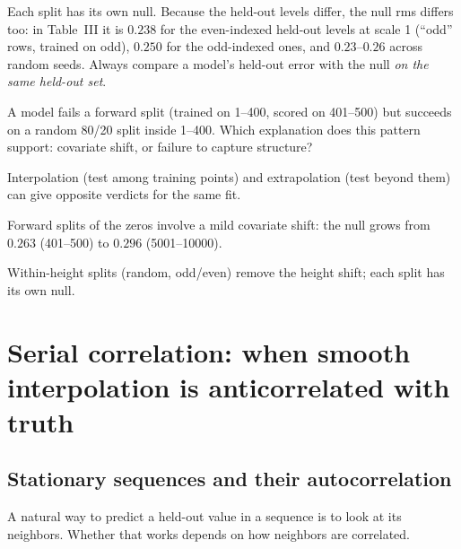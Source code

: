 \begin{pitfall}
Each split has its own null. Because the held-out levels differ, the null rms differs too: in Table~III it is $0.238$ for the even-indexed held-out levels at scale 1 (``odd'' rows, trained on odd), $0.250$ for the odd-indexed ones, and $0.23$--$0.26$ across random seeds. Always compare a model's held-out error with the null \emph{on the same held-out set}.
\end{pitfall}

\begin{checkpoint}
A model fails a forward split (trained on 1--400, scored on 401--500) but succeeds on a random 80/20 split inside 1--400. Which explanation does this pattern support: covariate shift, or failure to capture structure?
\end{checkpoint}

\begin{keyideas}
\item Interpolation (test among training points) and extrapolation (test beyond them) can give opposite verdicts for the same fit.
\item Forward splits of the zeros involve a mild covariate shift: the null grows from $0.263$ (401--500) to $0.296$ (5001--10000).
\item Within-height splits (random, odd/even) remove the height shift; each split has its own null.
\end{keyideas}

\section{Serial correlation: when smooth interpolation is anticorrelated with truth}\label{sec:generalization-serial}

\subsection{Stationary sequences and their autocorrelation}

A natural way to predict a held-out value in a sequence is to look at its neighbors. Whether that works depends on how neighbors are correlated.

